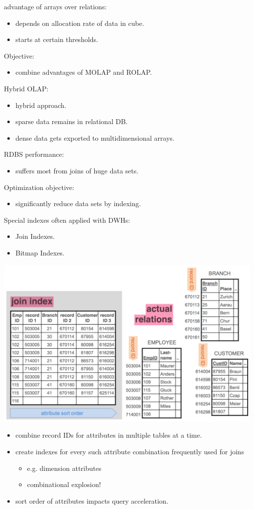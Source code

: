 \begin{breakbox}
\newline advantage of arrays over relations:
\begin{itemize}
	\item depends on allocation rate of data in cube.
	\item starts at certain thresholds.
\end{itemize}
Objective:
\begin{itemize}
	\item combine advantages of MOLAP and ROLAP.
\end{itemize}
Hybrid OLAP:
\begin{itemize}
	\item hybrid approach.
	\item sparse data remains in relational DB.
	\item dense data gets exported to multidimensional arrays.
\end{itemize}
\end{breakbox}

\begin{breakbox}
\newline RDBS performance:
\begin{itemize}
	\item suffers most from joins of huge data sets.
\end{itemize}
 Optimization objective:
\begin{itemize}
	\item significantly reduce data sets by indexing.
\end{itemize}
Special indexes often applied with DWHs:
\begin{itemize}
	\item Join Indexes.
	\item Bitmap Indexes.
\end{itemize}
\end{breakbox}

\begin{breakbox}
\begin{center}
\includegraphics[width=.15\textwidth]{slides_images/join_indexes.png}
\end{center}
\begin{itemize}
	\item combine record IDs for attributes in multiple tables at a time.
	\item create indexes for every such attribute combination frequently used for joins
	\begin{itemize}
		\item e.g. dimension attributes
		\item combinational explosion!
	\end{itemize}
	\item sort order of attributes impacts query acceleration.
\end{itemize}
\end{breakbox}

